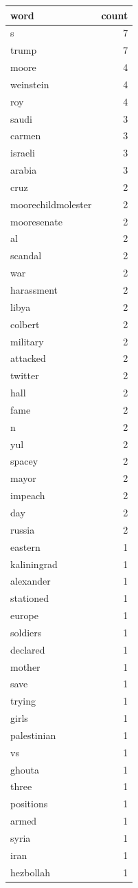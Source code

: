 \begin{tabular}{lr}
\toprule
word & count \\
\midrule
s & 7 \\
trump & 7 \\
moore & 4 \\
weinstein & 4 \\
roy & 4 \\
saudi & 3 \\
carmen & 3 \\
israeli & 3 \\
arabia & 3 \\
cruz & 2 \\
moorechildmolester & 2 \\
mooresenate & 2 \\
al & 2 \\
scandal & 2 \\
war & 2 \\
harassment & 2 \\
libya & 2 \\
colbert & 2 \\
military & 2 \\
attacked & 2 \\
twitter & 2 \\
hall & 2 \\
fame & 2 \\
n & 2 \\
yul & 2 \\
spacey & 2 \\
mayor & 2 \\
impeach & 2 \\
day & 2 \\
russia & 2 \\
eastern & 1 \\
kaliningrad & 1 \\
alexander & 1 \\
stationed & 1 \\
europe & 1 \\
soldiers & 1 \\
declared & 1 \\
mother & 1 \\
save & 1 \\
trying & 1 \\
girls & 1 \\
palestinian & 1 \\
vs & 1 \\
ghouta & 1 \\
three & 1 \\
positions & 1 \\
armed & 1 \\
syria & 1 \\
iran & 1 \\
hezbollah & 1 \\
\bottomrule
\end{tabular}
